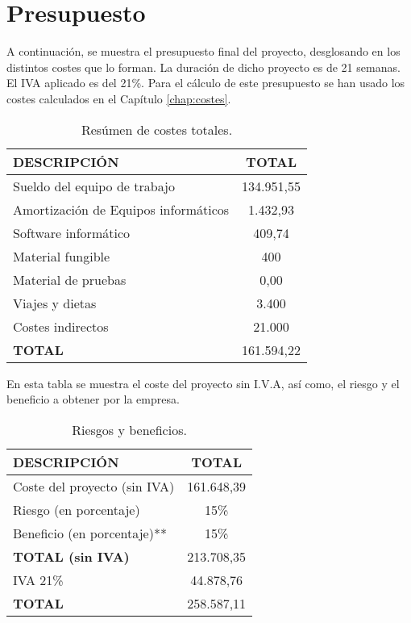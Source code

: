 \section{Presupuesto}

\par A continuación, se muestra el presupuesto final del proyecto, desglosando en los distintos costes que lo forman. La duración de dicho proyecto es de 21 semanas. El IVA aplicado es del 21\%. Para el cálculo de este presupuesto se han usado los costes calculados en el Capítulo \ref{chap:costes}.



\begin{table}[H]
\begin{center}
\begin{tabular}{l c}
\textbf{DESCRIPCIÓN} & \textbf{TOTAL}\\ \hline \hline
Sueldo del equipo de trabajo & 134.951,55\\
Amortización de Equipos informáticos & 1.432,93\\
Software informático & 409,74\\
Material fungible & 400\\
Material de pruebas & 0,00\\
Viajes y dietas & 3.400\\
Costes indirectos & 21.000\\ \hline \hline
\textbf{TOTAL} & 161.594,22\\ \hline
\end{tabular}
\caption{Resúmen de costes totales.}
\label{tab:resumenTotal}
\end{center}
\end{table}

En esta tabla se muestra el coste del proyecto sin I.V.A, así como, el riesgo y el beneficio a obtener por la empresa.
\begin{table}[H]
\begin{center}
\begin{tabular}{l c}
\textbf{DESCRIPCIÓN} & \textbf{TOTAL}\\ \hline \hline
Coste del proyecto (sin IVA) &  161.648,39\\
Riesgo (en porcentaje) & 15\% \\
Beneficio (en porcentaje)** & 15\% \\ \hline \hline
\textbf{TOTAL (sin IVA)} & 213.708,35\\ \hline \hline
IVA 21\% & 44.878,76 \\\hline \hline
\textbf{TOTAL} & 258.587,11\\ \hline
\end{tabular}
\caption{Riesgos y beneficios.}
\label{tab:total}
\end{center}
\end{table}



